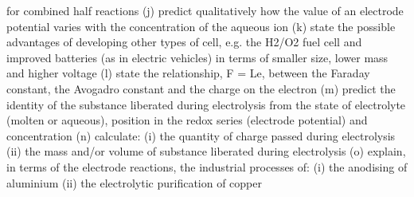for combined half reactions
(j) predict qualitatively how the value of an electrode potential varies with the concentration of the aqueous ion
(k) state the possible advantages of developing other types of cell, e.g. the H2/O2 fuel cell and improved
batteries (as in electric vehicles) in terms of smaller size, lower mass and higher voltage
(l) state the relationship, F = Le, between the Faraday constant, the Avogadro constant and the charge on the
electron
(m) predict the identity of the substance liberated during electrolysis from the state of electrolyte (molten or
aqueous), position in the redox series (electrode potential) and concentration
(n) calculate:
(i) the quantity of charge passed during electrolysis
(ii) the mass and/or volume of substance liberated during electrolysis
(o) explain, in terms of the electrode reactions, the industrial processes of:
(i) the anodising of aluminium
(ii) the electrolytic purification of copper
\pagebreak